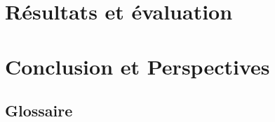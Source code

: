 \documentclass[11pt, a4paper]{book}
\begin{document}
\chapter{Résultats et évaluation}
\label{sec:ch6}


\chapter{Conclusion et Perspectives}


\begin{appendices}
	\chapter{Glossaire}
	
	
	
\end{appendices}



\newevenside
\clearpage
\clearpage
\clearpage

\end{document}
